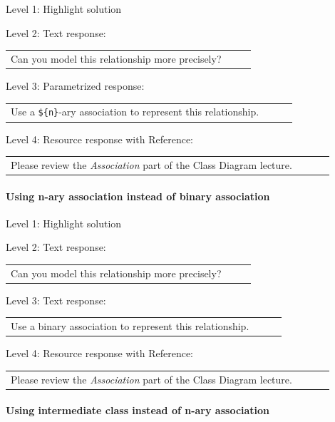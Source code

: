 \noindent Level 1: Highlight solution \medskip

\noindent Level 2: Text response: \medskip

\begin{tabular}{|p{0.9\linewidth}}
Can you model this relationship more precisely?
\end{tabular} \medskip

\noindent Level 3: Parametrized response: \medskip

\begin{tabular}{|p{0.9\linewidth}}
Use a \verb|${n}|-ary association to represent this relationship.
\end{tabular} \medskip

\noindent Level 4: Resource response with Reference: \medskip

\begin{tabular}{|p{0.9\linewidth}}
Please review the \textit{Association} part of the Class Diagram lecture.
\end{tabular} \medskip


\paragraph{Using n-ary association instead of binary association}

\noindent Level 1: Highlight solution \medskip

\noindent Level 2: Text response: \medskip

\begin{tabular}{|p{0.9\linewidth}}
Can you model this relationship more precisely?
\end{tabular} \medskip

\noindent Level 3: Text response: \medskip

\begin{tabular}{|p{0.9\linewidth}}
Use a binary association to represent this relationship.
\end{tabular} \medskip

\noindent Level 4: Resource response with Reference: \medskip

\begin{tabular}{|p{0.9\linewidth}}
Please review the \textit{Association} part of the Class Diagram lecture.
\end{tabular} \medskip


\paragraph{Using intermediate class instead of n-ary association}

